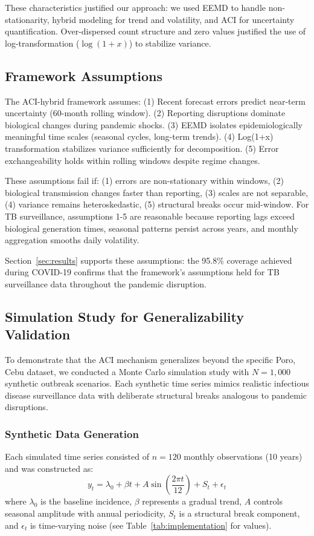 \documentclass[final,3p,times,twocolumn,authoryear]{elsarticle}
\begin{document}
These characteristics justified our approach: we used EEMD to handle non-stationarity, hybrid modeling for trend and volatility, and ACI for uncertainty quantification. Over-dispersed count structure and zero values justified the use of log-transformation ($\log(1+x)$) to stabilize variance.

\subsection{Framework Assumptions}
\label{sec:assumptions}
The ACI-hybrid framework assumes: (1) Recent forecast errors predict near-term uncertainty (60-month rolling window). (2) Reporting disruptions dominate biological changes during pandemic shocks. (3) EEMD isolates epidemiologically meaningful time scales (seasonal cycles, long-term trends). (4) Log(1+x) transformation stabilizes variance sufficiently for decomposition. (5) Error exchangeability holds within rolling windows despite regime changes.

These assumptions fail if: (1) errors are non-stationary within windows, (2) biological transmission changes faster than reporting, (3) scales are not separable, (4) variance remains heteroskedastic, (5) structural breaks occur mid-window. For TB surveillance, assumptions 1-5 are reasonable because reporting lags exceed biological generation times, seasonal patterns persist across years, and monthly aggregation smooths daily volatility.

Section~\ref{sec:results} supports these assumptions: the 95.8\% coverage achieved during COVID-19 confirms that the framework's assumptions held for TB surveillance data throughout the pandemic disruption.

\subsection{Simulation Study for Generalizability Validation}
\label{sec:simulation}
To demonstrate that the ACI mechanism generalizes beyond the specific Poro, Cebu dataset, we conducted a Monte Carlo simulation study with $N=1,000$ synthetic outbreak scenarios. Each synthetic time series mimics realistic infectious disease surveillance data with deliberate structural breaks analogous to pandemic disruptions.

\subsubsection{Synthetic Data Generation}
Each simulated time series consisted of $n=120$ monthly observations (10 years) and was constructed as:
\begin{equation}
\label{eq:sim_gen}
y_t = \lambda_0 + \beta t + A\sin\left(\frac{2\pi t}{12}\right) + S_t + \epsilon_t
\end{equation}
where $\lambda_0$ is the baseline incidence, $\beta$ represents a gradual trend, $A$ controls seasonal amplitude with annual periodicity, $S_t$ is a structural break component, and $\epsilon_t$ is time-varying noise (see Table~\ref{tab:implementation} for values).
\end{document}
